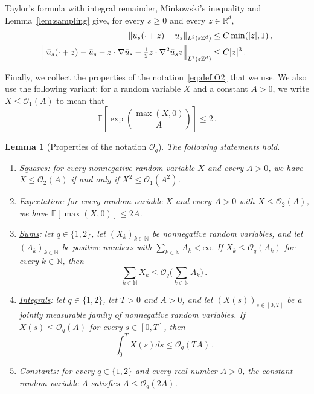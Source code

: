 \documentclass[11pt]{amsart}
\newtheorem{lemma}[theorem]{Lemma}
\numberwithin{equation}{section}
\newcommand{\Z}{\mathbb{Z}}
\newcommand{\R}{\mathbb{R}}
\newcommand{\E}{\mathbb{E}}
\newcommand{\cO}{\mathcal{O}}
\newcommand{\eps}{\varepsilon}
\begin{document}
Taylor's formula with integral remainder, Minkowski's inequality and Lemma~\ref{lem:sampling} give, for every $s \geq 0$ and every $z \in \R^d$,
\begin{align}
    \|\bar u_s(\cdot + z) - \bar u_s\|_{L^2(\eps \Z^d)} &\leq C \min(|z|, 1)\,, \label{eq:increment} \\
    \Bigl\| \bar u_s(\cdot + z) - \bar u_s - z \cdot \nabla \bar u_s - \tfrac12 z \cdot \nabla^2 \bar u_s z \Bigr\|_{L^2(\eps \Z^d)} &\leq C |z|^3\,. \label{eq:taylor}
\end{align}

Finally, we collect the properties of the notation~\eqref{eq:def.O2} that we use.
We also use the following variant: for a random variable $X$ and a constant $A > 0$, we write $X \leq \cO_1(A)$ to mean that
\begin{equation*}
    \E \left[ \exp \left( \frac{\max(X, 0)}{A} \right) \right] \leq 2\,.
\end{equation*}

\begin{lemma}[Properties of the notation $\cO_q$] \label{lem:O}
The following statements hold.
\begin{enumerate}
    \item[\textup{(i)}] \underline{\emph{Squares}}: for every nonnegative random variable $X$ and every $A > 0$, we have $X \leq \cO_2(A)$ if and only if $X^2 \leq \cO_1(A^2)$.
    \item[\textup{(ii)}] \underline{\emph{Expectation}}: for every random variable $X$ and every $A > 0$ with $X \leq \cO_2(A)$, we have $\E[\max(X, 0)] \leq 2A$.
    \item[\textup{(iii)}] \underline{\emph{Sums}}: let $q \in \{1,2\}$, let $(X_k)_{k \in \mathbb{N}}$ be nonnegative random variables, and let $(A_k)_{k \in \mathbb{N}}$ be positive numbers with $\sum_{k \in \mathbb{N}} A_k < \infty$.
    If $X_k \leq \cO_q(A_k)$ for every $k \in \mathbb{N}$, then
    \begin{equation*}
        \sum_{k \in \mathbb{N}} X_k \leq \cO_q \biggl( \sum_{k \in \mathbb{N}} A_k \biggr)\,.
    \end{equation*}
    \item[\textup{(iv)}] \underline{\emph{Integrals}}: let $q \in \{1,2\}$, let $T > 0$ and $A > 0$, and let $(X(s))_{s \in [0,T]}$ be a jointly measurable family of nonnegative random variables.
    If $X(s) \leq \cO_q(A)$ for every $s \in [0,T]$, then
    \begin{equation*}
        \int_0^T X(s) ds \leq \cO_q(T A)\,.
    \end{equation*}
    \item[\textup{(v)}] \underline{\emph{Constants}}: for every $q \in \{1,2\}$ and every real number $A > 0$, the constant random variable $A$ satisfies $A \leq \cO_q(2A)$.
\end{enumerate}
\end{lemma}
\end{document}
